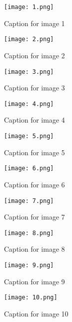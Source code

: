 \begin{figure}[htbp]
    \centering
    \texttt{[image: 1.png]}
    \caption{Caption for image 1}
    \label{fig:image1}
\end{figure}

\begin{figure}[htbp]
    \centering
    \texttt{[image: 2.png]}
    \caption{Caption for image 2}
    \label{fig:image2}
\end{figure}

\begin{figure}[htbp]
    \centering
    \texttt{[image: 3.png]}
    \caption{Caption for image 3}
    \label{fig:image3}
\end{figure}

\begin{figure}[htbp]
    \centering
    \texttt{[image: 4.png]}
    \caption{Caption for image 4}
    \label{fig:image4}
\end{figure}

\begin{figure}[htbp]
    \centering
    \texttt{[image: 5.png]}
    \caption{Caption for image 5}
    \label{fig:image5}
\end{figure}

\begin{figure}[htbp]
    \centering
    \texttt{[image: 6.png]}
    \caption{Caption for image 6}
    \label{fig:image6}
\end{figure}

\begin{figure}[htbp]
    \centering
    \texttt{[image: 7.png]}
    \caption{Caption for image 7}
    \label{fig:image7}
\end{figure}

\begin{figure}[htbp]
    \centering
    \texttt{[image: 8.png]}
    \caption{Caption for image 8}
    \label{fig:image8}
\end{figure}

\begin{figure}[htbp]
    \centering
    \texttt{[image: 9.png]}
    \caption{Caption for image 9}
    \label{fig:image9}
\end{figure}

\begin{figure}[htbp]
    \centering
    \texttt{[image: 10.png]}
    \caption{Caption for image 10}
    \label{fig:image10}
\end{figure}

